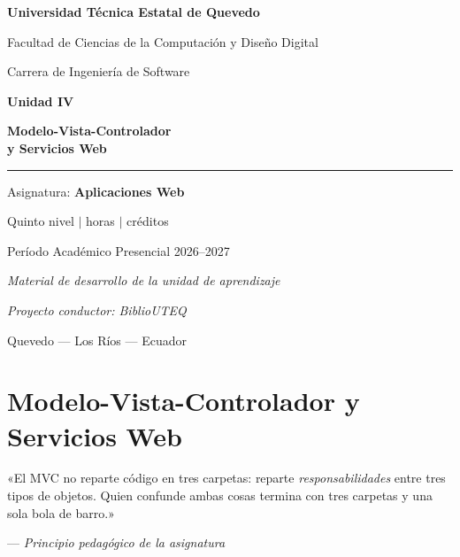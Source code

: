 \documentclass[11pt,a4paper,openany]{book}
\begin{document}
\frontmatter

\begin{titlepage}
	\centering
	\vspace*{1.5cm}
	{\LARGE\bfseries\color{uteqverde} Universidad Técnica Estatal de Quevedo\par}
	\vspace{0.4cm}
	{\large Facultad de Ciencias de la Computación y Diseño Digital\par}
	{\large Carrera de Ingeniería de Software\par}
	\vspace{2.2cm}
	{\Huge\bfseries\color{uteqverde} Unidad IV\par}
	\vspace{0.5cm}
	{\Huge\bfseries Modelo-Vista-Controlador\\[0.3cm] y Servicios Web\par}
	\vspace{1.2cm}
	\rule{0.75\textwidth}{1.5pt}\par
	\vspace{0.8cm}
	{\Large Asignatura: \textbf{Aplicaciones Web}\par}
	\vspace{0.3cm}
	{\large Quinto nivel \quad$\vert$ horas \quad$\vert$ créditos\par}
	{\large Período Académico Presencial 2026--2027\par}
	\vspace{2.5cm}
	{\large\itshape Material de desarrollo de la unidad de aprendizaje\par}
	{\large\itshape Proyecto conductor: BiblioUTEQ\par}
	\vfill
	{\large Quevedo --- Los Ríos --- Ecuador\par}
\end{titlepage}

\tableofcontents
\listoffigures
\listoftables
\lstlistoflistings

\mainmatter
\setcounter{chapter}{3}

\chapter{Modelo-Vista-Controlador y Servicios Web}
\label{cap:unidad4}

\epigraph{«El MVC no reparte código en tres carpetas: reparte
\emph{responsabilidades} entre tres tipos de objetos. Quien confunde
ambas cosas termina con tres carpetas y una sola bola de barro.»}
{--- \textit{Principio pedagógico de la asignatura}}
\end{document}
